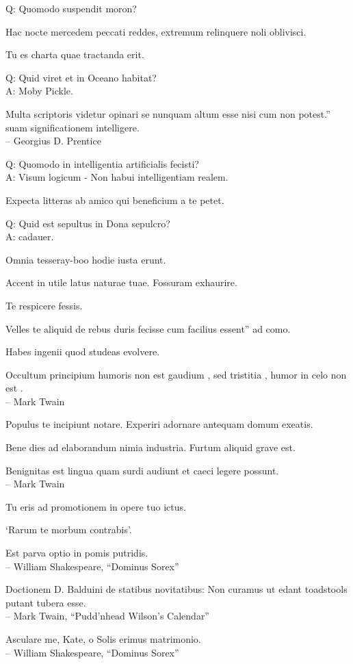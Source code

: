 \documentclass[titlepage,12pt]{memoir}
\begin{document}
Q: Quomodo suspendit moron?

 Hac nocte mercedem peccati reddes, extremum relinquere noli oblivisci.

Tu es charta quae tractanda erit.

Q: Quid viret et in Oceano habitat?\\
A: Moby Pickle.

Multa scriptoris videtur opinari se nunquam altum esse nisi cum non potest.”
suam significationem intelligere.
\\-- Georgius D. Prentice

Q: Quomodo in intelligentia artificialis fecisti?\\
A: Visum logicum - Non habui intelligentiam realem.

Expecta litteras ab amico qui beneficium a te petet.

Q: Quid est sepultus in Dona sepulcro?\\
A: cadauer.

Omnia tesseray-boo hodie iusta erunt.

Accent in utile latus naturae tuae. Fossuram exhaurire.

Te respicere fessis.

Velles te aliquid de rebus duris fecisse cum facilius essent”
ad como.

Habes ingenii quod studeas evolvere.

 Occultum principium humoris non est gaudium , sed tristitia , humor in celo non est .
\\-- Mark Twain

Populus te incipiunt notare. Experiri adornare antequam domum exeatis.

Bene dies ad elaborandum nimia industria. Furtum aliquid grave est.

 Benignitas est lingua quam surdi audiunt et caeci legere possunt.
\\-- Mark Twain

Tu eris ad promotionem in opere tuo ictus.

‘Rarum te morbum contrabis’.

Est parva optio in pomis putridis.
\\-- William Shakespeare, “Dominus Sorex”

Doctionem D. Balduini de statibus novitatibus: Non curamus ut edant toadstools
putant tubera esse.
\\-- Mark Twain, “Pudd’nhead Wilson’s Calendar”

Asculare me, Kate, o Solis erimus matrimonio.
\\-- William Shakespeare, “Dominus Sorex”
\end{document}
